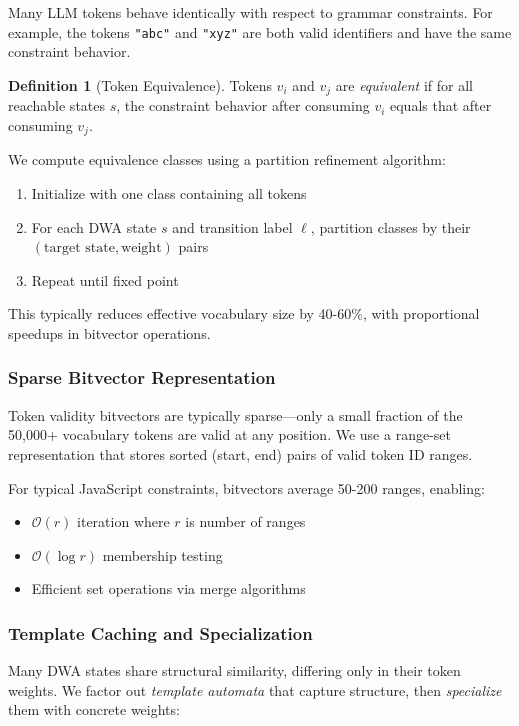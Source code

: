 \documentclass[11pt,a4paper]{article}
\newcommand{\bigO}{\mathcal{O}}
\theoremstyle{plain}
\theoremstyle{definition}
\newtheorem{definition}[theorem]{Definition}
\theoremstyle{remark}
\begin{document}
Many LLM tokens behave identically with respect to grammar constraints. For example, the tokens \texttt{"abc"} and \texttt{"xyz"} are both valid identifiers and have the same constraint behavior.

\begin{definition}[Token Equivalence]
Tokens $v_i$ and $v_j$ are \emph{equivalent} if for all reachable states $s$, the constraint behavior after consuming $v_i$ equals that after consuming $v_j$.
\end{definition}

We compute equivalence classes using a partition refinement algorithm:
\begin{enumerate}
\item Initialize with one class containing all tokens
\item For each DWA state $s$ and transition label $\ell$, partition classes by their $(\text{target state}, \text{weight})$ pairs
\item Repeat until fixed point
\end{enumerate}

This typically reduces effective vocabulary size by 40-60\%, with proportional speedups in bitvector operations.

\subsubsection{Sparse Bitvector Representation}

Token validity bitvectors are typically sparse---only a small fraction of the 50,000+ vocabulary tokens are valid at any position. We use a range-set representation that stores sorted (start, end) pairs of valid token ID ranges.

For typical JavaScript constraints, bitvectors average 50-200 ranges, enabling:
\begin{itemize}
\item $\bigO(r)$ iteration where $r$ is number of ranges
\item $\bigO(\log r)$ membership testing
\item Efficient set operations via merge algorithms
\end{itemize}

\subsubsection{Template Caching and Specialization}

Many DWA states share structural similarity, differing only in their token weights. We factor out \emph{template automata} that capture structure, then \emph{specialize} them with concrete weights:
\end{document}
